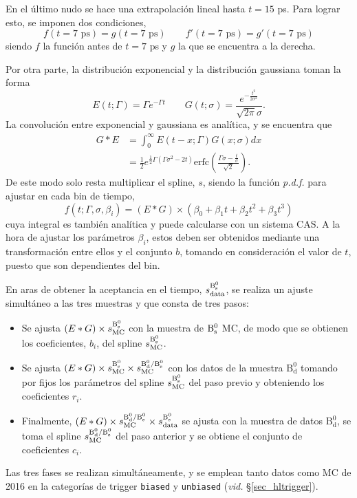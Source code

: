 En el último nudo se hace una extrapolación lineal hasta $t=15$ ps. Para lograr esto, se imponen dos condiciones, 
\[f(t=7 \text{ ps}) = g(t=7 \text{ ps}) \qquad f'(t=7 \text{ ps}) = g'(t=7 \text{ ps}) \]
siendo $f$ la función antes de $t=7$ ps y $g$ la que se encuentra a la derecha.


Por otra parte, la distribución exponencial y la distribución gaussiana toman la forma
\[E(t;\Gamma) = \Gamma e^{-\Gamma t}
\qquad 
G(t;\sigma) = \frac{e^{-\frac{t^2}{2 \sigma^2}}}{\sqrt{2 \pi } \sigma}.\]
La convolución entre exponencial y gaussiana es analítica, y se encuentra que
\begin{equation}
\begin{split}
    G * E &= \int_0^{\infty} E(t-x;\Gamma) G(x;\sigma) dx\\ &= \frac{1}{2} e^{\frac{1}{2} \Gamma \left(\Gamma \sigma^2-2 t\right)} \text{erfc}\left(\frac{\Gamma \sigma-\frac{t}{\sigma}}{\sqrt{2}}\right).
\end{split}
\end{equation}
%
De este modo solo resta multiplicar el spline, $s$, siendo la función \textit{p.d.f.} para ajustar en cada bin de tiempo,
\begin{equation}
 f(t;\Gamma,\sigma,\beta_i) =  (E * G) \times (\beta_0 + \beta_1 t + \beta_2 t^2 + \beta_3 t^3)
\end{equation}
cuya integral es también analítica y puede calcularse con un sistema CAS. A la hora de ajustar los parámetros $\beta_i$, estos deben ser obtenidos mediante una transformación entre ellos y el conjunto $b$, tomando en consideración el valor de $t$, puesto que son dependientes del bin.

En aras de obtener la aceptancia en el tiempo, $s_{\text{data}}^{\text{B}{}_{\text{s}}^{\text{0}}} $, se realiza un ajuste simultáneo a las tres muestras y que consta de tres pasos:
\begin{itemize}
  \item Se ajusta $(E*G) \times s_{\text{MC}}^{\text{B}{}_{\text{s}}^{\text{0}}}$  con la muestra de $\text{B}{}_{\text{s}}^{\text{0}}$ MC, de modo que se obtienen los coeficientes, $b_i$, del spline $s_{\text{MC}}^{\text{B}{}_{\text{s}}^{\text{0}}} $.
  \item Se ajusta $(E*G) \times s_{\text{MC}}^{\text{B}{}_{\text{s}}^{\text{0}}} \times s_{\text{MC}}^{\mathrm{B_d^0}/\text{B}{}_{\text{s}}^{\text{0}}} $ con los datos de la muestra $\mathrm{B_d^0}$ tomando por fijos los parámetros del spline $s_{\text{MC}}^{\text{B}{}_{\text{s}}^{\text{0}}} $ del paso previo y obteniendo los coeficientes $r_i$.
  \item Finalmente, $(E*G) \times s_{\text{MC}}^{\mathrm{B_d^0}/\text{B}{}_{\text{s}}^{\text{0}}} \times s_{\text{data}}^{\text{B}{}_{\text{s}}^{\text{0}}} $ se ajusta con la muestra de datos $\mathrm{B_d^0}$, se toma el spline $s_{\text{MC}}^{\mathrm{B_d^0}/\text{B}{}_{\text{s}}^{\text{0}}} $ del paso anterior y se obtiene el conjunto de coeficientes $c_i$.
\end{itemize}
%
Las tres fases se realizan simultáneamente, y se emplean tanto datos como MC de 2016 en la categorías de trigger \texttt{biased} y \texttt{unbiased} (\textit{vid.} \S \ref{sec_hltrigger}).


